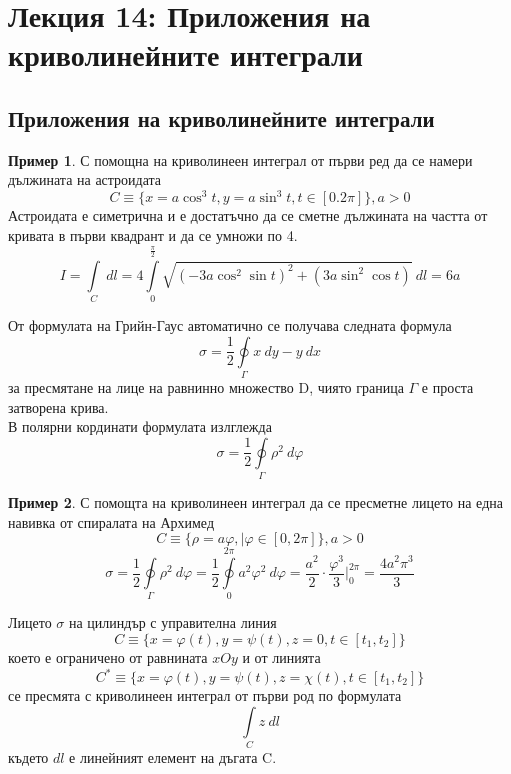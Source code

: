 \documentclass[a4paper,fleqn,12pt]{article}
\theoremstyle{definition}
\newtheorem{example}{Пример}[subsection]
\begin{document}
\newpage
\section{Лекция 14: Приложения на криволинейните интеграли}

\subsection{Приложения на криволинейните интеграли}

\begin{example}
С помощна на криволинеен интеграл от първи ред да се намери дължината на астроидата
$$C \equiv \{ x = a\cos^3 t, y = a\sin^3 t, t \in [0.2\pi]\}, a>0$$
Астроидата е симетрична и е достатъчно да се сметне дължината на частта от кривата в първи квадрант и да се умножи по 4.
$$I = \int\limits_C \ dl = 4 \int\limits_0 ^{\frac{\pi}{2}} \sqrt{(-3a\cos^2 \sin t)^2+(3a\sin^2 \cos t)} \ dl = 6a$$
\end{example}
От формулата на Грийн-Гаус автоматично се получава следната формула
$$\sigma = \frac{1}{2} \oint\limits_{\Gamma} x \ dy - y \ dx$$
за пресмятане на лице на равнинно множество D, чиято граница $\Gamma$ е проста затворена крива. \\
В полярни кординати формулата излглежда
$$\sigma = \frac{1}{2}\oint\limits_{\Gamma} \rho^2 \ d\varphi$$

\begin{example}
С помощта на криволинеен интеграл да се пресметне лицето на една навивка от спиралата на Архимед
$$C \equiv \{ \rho = a\varphi, | \varphi \in [0, 2\pi]\}, a>0$$
$$\sigma = \frac{1}{2}\oint\limits_{\Gamma} \rho^2 \ d\varphi = \frac{1}{2}\oint\limits_0 ^{2\pi} a^2 \varphi^2 \ d\varphi = \frac{a^2}{2} \cdot \frac{\varphi^3}{3} \Big|_0 ^{2\pi} = \frac{4a^2\pi^3}{3}$$
\end{example}
Лицето $\sigma$ на цилиндър с управителна линия
$$C \equiv \{ x = \varphi(t), y = \psi(t), z = 0, t \in[t_1,t_2]\}$$
което е ограничено от равнината $xOy$ и от линията
$$C^* \equiv \{ x = \varphi(t), y = \psi(t), z = \chi(t), t \in[t_1,t_2]\}$$
се пресмята с криволинеен интеграл от първи род по формулата 
$$\int\limits_C z \ dl$$
където $dl$ е линейният елемент на дъгата C.
\end{document}
